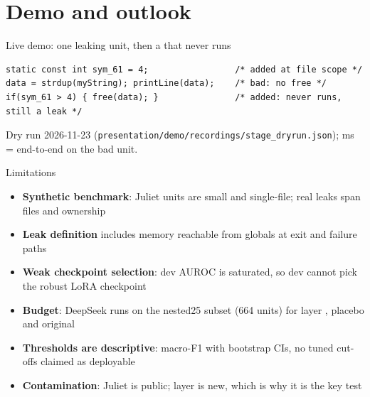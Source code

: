 \section{Demo and outlook}

\begin{frame}[fragile]{Live demo: one leaking unit, then a  that never runs}
  \vspace{-2pt}
\begin{lstlisting}[style=unit]
static const int sym_61 = 4;                 /* added at file scope */
data = strdup(myString); printLine(data);    /* bad: no free */
if(sym_61 > 4) { free(data); }               /* added: never runs, still a leak */
\end{lstlisting}
  \vspace{-2pt}
  \centering
  {\footnotesize\renewcommand{\arraystretch}{0.88}\par}
  {\scriptsize Dry run 2026-11-23 (\texttt{presentation/demo/recordings/stage\_dryrun.json}); ms = end-to-end on the bad unit.\par}
\end{frame}

\begin{frame}{Limitations}
  \begin{itemize}
    \item \textbf{Synthetic benchmark}: Juliet units are small and single-file; real leaks span files and ownership
    \item \textbf{Leak definition} includes memory reachable from globals at exit and  failure paths
    \item \textbf{Weak checkpoint selection}: dev AUROC is saturated, so dev cannot pick the robust LoRA checkpoint
    \item \textbf{Budget}: DeepSeek runs on the nested25 subset (664 units) for layer , placebo and original
    \item \textbf{Thresholds are descriptive}: macro-F1 with bootstrap CIs, no tuned cut-offs claimed as deployable
    \item \textbf{Contamination}: Juliet is public; layer  is new, which is why it is the key test
  \end{itemize}
\end{frame}

